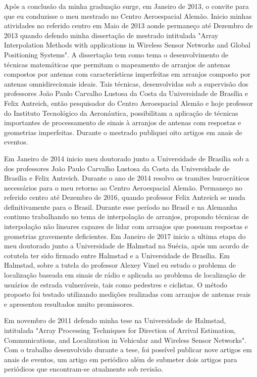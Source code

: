 \documentclass[12pt]{report}
\begin{document}
Após a conclusão da minha graduação surge, em Janeiro de 2013, o convite para que eu conduzisse o meu mestrado no Centro Aeroespacial Alemão. Inicio minhas atividades no referido centro em Maio de 2013 aonde permaneço até Dezembro de 2013 quando defendo minha dissertação de mestrado intitulada "Array Interpolation Methods with applications in Wireless Sensor Networks and Global Positioning Systems". A dissertação tem como tema o desenvolvimento de técnicas matemáticas que permitam o mapeamento de arranjos de antenas compostos por antenas com características imperfeitas em arranjos composto por antenas omnidirecionais ideais. Tais técnicas, desenvolvidas sob a supervisão dos professores João Paulo Carvalho Lustosa da Costa da Universidade de Brasília e Felix Antreich, então pesquisador do Centro Aeroespacial Alemão e hoje professor do Instituto Tecnológico da Aeronáutica, possibilitam a aplicação de técnicas importantes de processamento de sinais à arranjos de antenas com respostas e geometrias imperfeitas. Durante o mestrado publiquei oito artigos em anais de eventos.

Em Janeiro de 2014 inicio meu doutorado junto a Universidade de Brasília sob a dos professores João Paulo Carvalho Lustosa da Costa da Universidade de Brasília e Felix Antreich. Durante o ano de 2014 resolvo os tramites burocráticos necessários para o meu retorno ao Centro Aeroespacial Alemão. Permaneço no referido centro até Dezembro de 2016, quando professor Felix Antreich se muda definitivamente para o Brasil. Durante esse período no Brasil e na Alemanha continuo trabalhando no tema de interpolação de arranjos, propondo técnicas de interpolação não lineares capazes de lidar com arranjos que possuam respostas e geometrias gravemente deficientes. Em Janeiro de 2017 inicio a ultima etapa do meu doutorado junto a Universidade de Halmstad na Suécia, após um acordo de cotutela ter sido firmado entre Halmstad e a Universidade de Brasília. Em Halmstad, sobre a tutela do professor Alexey Vinel eu estudo o problema de localização baseada em sinais de rádio e aplicada ao problema de localização de usuários de estrada vulneráveis, tais como pedestres e ciclistas. O método proposto foi testado utilizando medições realizadas com arranjos de antenas reais e apresentou resultados muito promissores.

Em novembro de 2011 defendo minha tese na Universidade de Halmstad, intitulada "Array Processing Techniques for Direction of Arrival Estimation, Communications, and Localization in Vehicular and Wireless Sensor Networks". Com o trabalho desenvolvido durante a tese, foi possível publicar nove artigos em anais de eventos, um artigo em periódico além de submeter dois artigos para periódicos que encontram-se atualmente sob revisão. 
\end{document}
